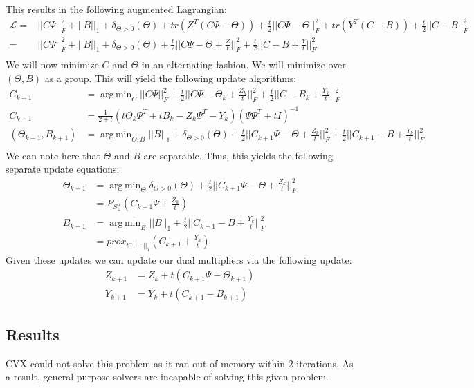 \documentclass[12pt, letterpaper]{article}
\DeclareMathOperator*{\argmin}{arg\,min}
\begin{document}
	This results in the following augmented Lagrangian:
	\begin{align*}
		\mathcal{L} =& ||C\Psi||_{F}^{2} + ||B||_{1} +\delta_{\Theta > 0}(\Theta) + tr(Z^{T}(C\Psi-\Theta)) + \frac{t}{2}|| C\Psi - \Theta||_{F}^{2} + tr(Y^T(C-B)) +\frac{t}{2}||C-B||_{F}^{2}\\
		=& ||C\Psi||_{F}^{2} + ||B||_{1} +\delta_{\Theta > 0}(\Theta) + \frac{t}{2}|| C\Psi - \Theta +\frac{Z}{t}||_{F}^{2} +\frac{t}{2}||C-B+\frac{Y}{t}||_{F}^{2}\\
	\end{align*}
	We will now minimize $C$ and $\Theta$ in an alternating fashion. We will minimize over $(\Theta,B)$ as a group. This will yield the following update algorithms:
	\begin{align*}
		C_{k+1} &= \argmin_{C} ||C\Psi||_{F}^{2}+ \frac{t}{2}|| C\Psi - \Theta_{k} +\frac{Z_{k}}{t}||_{F}^{2}+\frac{t}{2}||C-B_{k}+\frac{Y_{k}}{t}||_{F}^{2} \\
		     C_{k+1}   &= \frac{1}{2+t}\left(t\Theta_{k}\Psi^{T}+tB_{k}-Z_{k}\Psi^{T}-Y_{k}\right)\left(\Psi\Psi^{T} +tI\right)^{-1}\\
		(\Theta_{k+1},B_{k+1}) &= \argmin_{\Theta,B} ||B||_{1} +\delta_{\Theta > 0}(\Theta) + \frac{t}{2}|| C_{k+1}\Psi - \Theta +\frac{Z_{k}}{t}||_{F}^{2}+\frac{t}{2}||C_{k+1}-B+\frac{Y_{k}}{t}||_{F}^{2} \\
	\end{align*}
	We can note here that $\Theta$ and $B$ are separable. Thus, this yields the following separate update equations:
	\begin{align*}
		\Theta_{k+1} &= \argmin_{\Theta}\delta_{\Theta > 0}(\Theta) + \frac{t}{2}|| C_{k+1}\Psi - \Theta +\frac{Z_{k}}{t}||_{F}^{2}\\
		             &= P_{S_{+}^{n}}(C_{k+1}\Psi +\frac{Z_{k}}{t})\\
		     B_{k+1} &=\argmin_{B} ||B||_{1} +\frac{t}{2}||C_{k+1}-B+\frac{Y_{k}}{t}||_{F}^{2} \\
		      		 &=prox_{t^{-1}||\cdot||_{1}}(C_{k+1}+\frac{Y_{k}}{t})
	\end{align*}
	Given these updates we can update our dual multipliers via the following update:
	\begin{align*}
		Z_{k+1} &= Z_{k} +t(C_{k+1}\Psi -\Theta_{k+1})\\
		Y_{k+1} &= Y_{k} +t(C_{k+1}-B_{k+1})
	\end{align*}

	\subsection{Results}
	CVX could not solve this problem as it ran out of memory within 2 iterations. As a result, general purpose solvers are incapable of solving this given problem.
	
\end{document}
